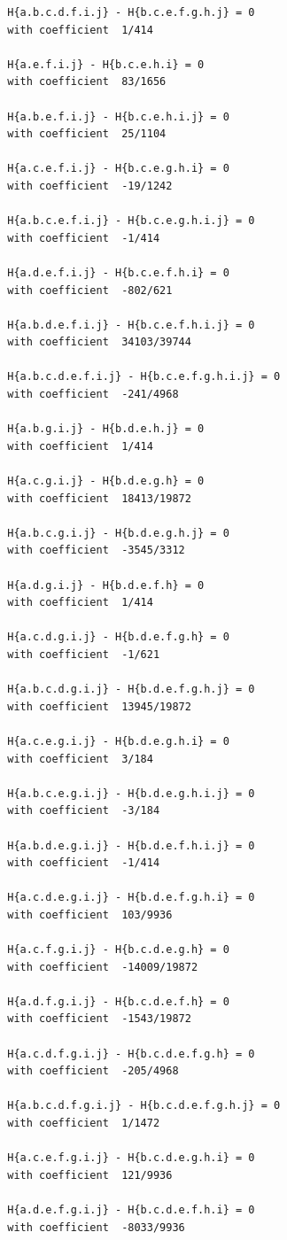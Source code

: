 \documentclass[11pt, a4paper]{kybernetika}
\begin{document}
\begin{verbatim}
		H{a.b.c.d.f.i.j} - H{b.c.e.f.g.h.j} = 0
		with coefficient  1/414
		
		H{a.e.f.i.j} - H{b.c.e.h.i} = 0
		with coefficient  83/1656
		
		H{a.b.e.f.i.j} - H{b.c.e.h.i.j} = 0
		with coefficient  25/1104
		
		H{a.c.e.f.i.j} - H{b.c.e.g.h.i} = 0
		with coefficient  -19/1242
		
		H{a.b.c.e.f.i.j} - H{b.c.e.g.h.i.j} = 0
		with coefficient  -1/414
		
		H{a.d.e.f.i.j} - H{b.c.e.f.h.i} = 0
		with coefficient  -802/621
		
		H{a.b.d.e.f.i.j} - H{b.c.e.f.h.i.j} = 0
		with coefficient  34103/39744
		
		H{a.b.c.d.e.f.i.j} - H{b.c.e.f.g.h.i.j} = 0
		with coefficient  -241/4968
		
		H{a.b.g.i.j} - H{b.d.e.h.j} = 0
		with coefficient  1/414
		
		H{a.c.g.i.j} - H{b.d.e.g.h} = 0
		with coefficient  18413/19872
		
		H{a.b.c.g.i.j} - H{b.d.e.g.h.j} = 0
		with coefficient  -3545/3312
		
		H{a.d.g.i.j} - H{b.d.e.f.h} = 0
		with coefficient  1/414
		
		H{a.c.d.g.i.j} - H{b.d.e.f.g.h} = 0
		with coefficient  -1/621
		
		H{a.b.c.d.g.i.j} - H{b.d.e.f.g.h.j} = 0
		with coefficient  13945/19872
		
		H{a.c.e.g.i.j} - H{b.d.e.g.h.i} = 0
		with coefficient  3/184
		
		H{a.b.c.e.g.i.j} - H{b.d.e.g.h.i.j} = 0
		with coefficient  -3/184
		
		H{a.b.d.e.g.i.j} - H{b.d.e.f.h.i.j} = 0
		with coefficient  -1/414
		
		H{a.c.d.e.g.i.j} - H{b.d.e.f.g.h.i} = 0
		with coefficient  103/9936
		
		H{a.c.f.g.i.j} - H{b.c.d.e.g.h} = 0
		with coefficient  -14009/19872
		
		H{a.d.f.g.i.j} - H{b.c.d.e.f.h} = 0
		with coefficient  -1543/19872
		
		H{a.c.d.f.g.i.j} - H{b.c.d.e.f.g.h} = 0
		with coefficient  -205/4968
		
		H{a.b.c.d.f.g.i.j} - H{b.c.d.e.f.g.h.j} = 0
		with coefficient  1/1472
		
		H{a.c.e.f.g.i.j} - H{b.c.d.e.g.h.i} = 0
		with coefficient  121/9936
		
		H{a.d.e.f.g.i.j} - H{b.c.d.e.f.h.i} = 0
		with coefficient  -8033/9936
		

\end{verbatim}
\end{document}
